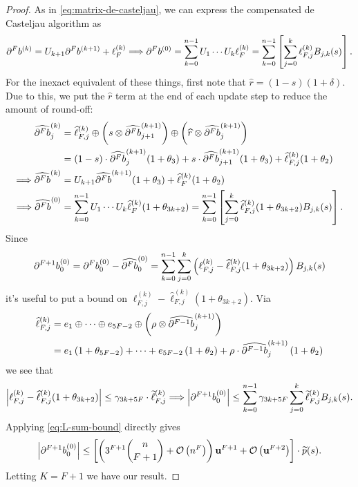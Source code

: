 \begin{proof}
As in \eqref{eq:matrix-de-casteljau}, we can express the compensated
de Casteljau algorithm as
\begin{equation}
\db{F}^{(k)} = U_{k + 1} \db{F}^{(k + 1)} + \ell_{F}^{(k)}
\Longrightarrow \db{F}^{(0)} = \sum_{k = 0}^{n - 1}
U_1 \cdots U_k \ell_F^{(k)} = \sum_{k = 0}^{n - 1}
\left[\sum_{j = 0}^k \ell_{F, j}^{(k)} B_{j, k}(s)\right].
\end{equation}
For the inexact equivalent of these things, first note that
\(\widehat{r} = (1 - s)(1 + \delta)\). Due to this,
we put the \(\widehat{r}\) term at the end of each update step to reduce
the amount of round-off:
\begin{align}
  \cdb{F}_j^{(k)} &=
  \widehat{\ell}_{F, j}^{(k)} \oplus
  \left(s \otimes \cdb{F}_{j + 1}^{(k + 1)}\right) \oplus
  \left(\widehat{r} \otimes \cdb{F}_j^{(k + 1)}\right) \\
&= (1 - s) \cdot \cdb{F}_j^{(k + 1)}(1 + \theta_3) +
  s \cdot \cdb{F}_{j + 1}^{(k + 1)}(1 + \theta_3) +
  \widehat{\ell}_{F, j}^{(k)} (1 + \theta_2) \\
\Longrightarrow \cdb{F}^{(k)} &=
  U_{k + 1} \cdb{F}^{(k + 1)}(1 + \theta_3) +
  \widehat{\ell}_{F}^{(k)} (1 + \theta_2) \\
\Longrightarrow \cdb{F}^{(0)} &=
  \sum_{k = 0}^{n - 1}
  U_1 \cdots U_k \widehat{\ell}_F^{(k)} (1 + \theta_{3k + 2})
  = \sum_{k = 0}^{n - 1}
  \left[\sum_{j = 0}^k \widehat{\ell}_{F, j}^{(k)} (1 + \theta_{3k + 2})
    B_{j, k}(s)\right].
\end{align}
Since
\begin{equation}
\db{F + 1}_0^{(0)} = \db{F}_0^{(0)} - \cdb{F}_0^{(0)} = \sum_{k = 0}^{n - 1}
\sum_{j = 0}^k \left(\ell_{F, j}^{(k)} -
\widehat{\ell}_{F, j}^{(k)} (1 + \theta_{3k + 2})\right) B_{j, k}(s)
\end{equation}
it's useful to put a bound on \(\ell_{F, j}^{(k)} -
\widehat{\ell}_{F, j}^{(k)} (1 + \theta_{3k + 2})\). Via
\begin{align}
\widehat{\ell}_{F, j}^{(k)} &= e_1 \oplus \cdots \oplus e_{5F - 2} \oplus
\left(\rho \otimes \cdb{F - 1}_j^{(k + 1)}\right) \\
&= e_1\left(1 + \theta_{5F - 2}\right) + \cdots +
e_{5F - 2}\left(1 + \theta_2\right) +
\rho \cdot \cdb{F - 1}_j^{(k + 1)} \left(1 + \theta_2\right)
\end{align}
we see that
\begin{equation}
\left|\ell_{F, j}^{(k)} -
\widehat{\ell}_{F, j}^{(k)} (1 + \theta_{3k + 2})\right| \leq
\gamma_{3k + 5F} \cdot \widetilde{\ell}_{F, j}^{(k)}
\Longrightarrow
\left|\db{F + 1}_0^{(0)}\right| \leq \sum_{k = 0}^{n - 1}
\gamma_{3k + 5F} \sum_{j = 0}^k \widetilde{\ell}_{F, j}^{(k)} B_{j, k}(s).
\end{equation}
Applying \eqref{eq:L-sum-bound} directly gives
\begin{equation}
\left|\db{F + 1}_0^{(0)}\right| \leq
  \left[\left(3^{F + 1} \binom{n}{F + 1} + \bigO{n^F}\right)
  \mach^{F + 1} + \bigO{\mach^{F + 2}}\right] \cdot \widetilde{p}(s).
\end{equation}
Letting \(K = F + 1\) we have our result.
\end{proof}

